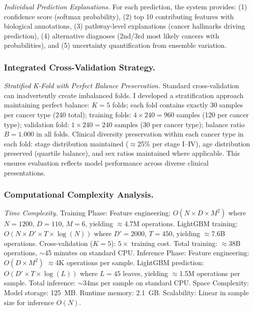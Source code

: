 \documentclass[manuscript, screen, review]{jair}
\begin{document}
\emph{Individual Prediction Explanations.} For each prediction, the system provides: (1) confidence score (softmax probability), (2) top 10 contributing features with biological annotations, (3) pathway-level explanations (cancer hallmarks driving prediction), (4) alternative diagnoses (2nd/3rd most likely cancers with probabilities), and (5) uncertainty quantification from ensemble variation.

\subsubsection{Integrated Cross-Validation Strategy.}
\label{sec:validation}

\emph{Stratified K-Fold with Perfect Balance Preservation.} Standard cross-validation can inadvertently create imbalanced folds. I developed a stratification approach maintaining perfect balance: $K = 5$ folds; each fold contains exactly 30 samples per cancer type (240 total); training folds: $4 \times 240 = 960$ samples (120 per cancer type); validation fold: $1 \times 240 = 240$ samples (30 per cancer type); balance ratio $B = 1.000$ in all folds. Clinical diversity preservation within each cancer type in each fold: stage distribution maintained ($\approx$25\% per stage I--IV), age distribution preserved (quartile balance), and sex ratios maintained where applicable. This ensures evaluation reflects model performance across diverse clinical presentations.

\subsubsection{Computational Complexity Analysis.}
\label{sec:complexity}

\emph{Time Complexity.} Training Phase: Feature engineering: $O(N \times D \times M^2)$ where $N=1200$, $D=110$, $M=6$, yielding $\approx$4.7M operations. LightGBM training: $O(N \times D' \times T \times \log(N))$ where $D'=2000$, $T=450$, yielding $\approx$7.6B operations. Cross-validation ($K=5$): $5\times$ training cost. Total training: $\approx$38B operations, $\sim$45 minutes on standard CPU. Inference Phase: Feature engineering: $O(D \times M^2)$ $\approx$4K operations per sample. LightGBM prediction: $O(D' \times T \times \log(L))$ where $L=45$ leaves, yielding $\approx$1.5M operations per sample. Total inference: $\sim$34ms per sample on standard CPU. Space Complexity: Model storage: 125~MB. Runtime memory: 2.1~GB. Scalability: Linear in sample size for inference $O(N)$.
\end{document}
